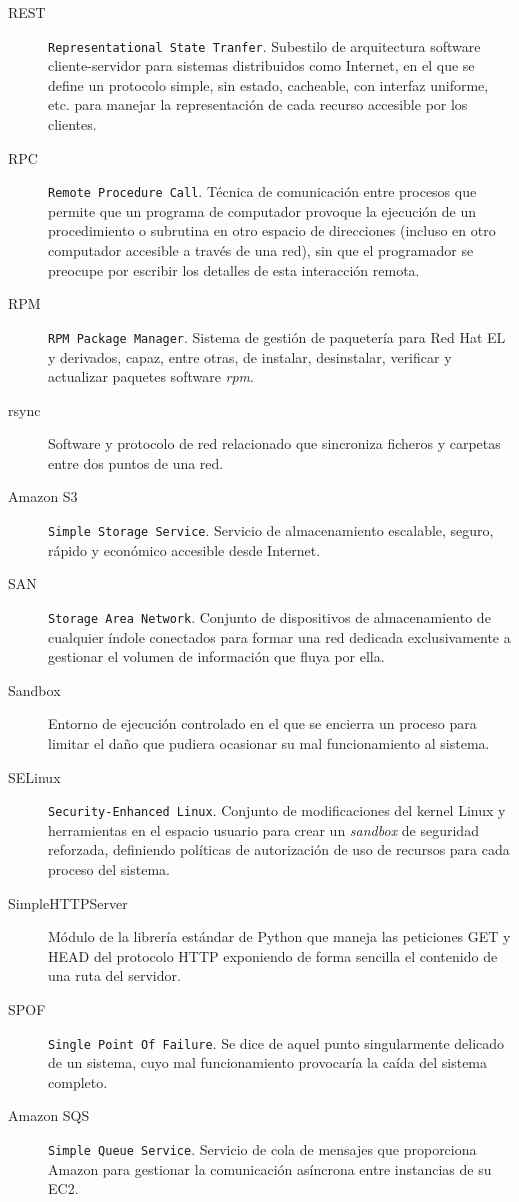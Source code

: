 \begin{description}
\item[REST] \texttt{Representational State Tranfer}. Subestilo de arquitectura software cliente-servidor para sistemas distribuidos como Internet, en el que se define un protocolo simple, sin estado, cacheable, con interfaz uniforme, etc. para manejar la representaci\'on de cada recurso accesible por los clientes.
\item[RPC] \texttt{Remote Procedure Call}. T\'ecnica de comunicaci\'on entre procesos que permite que un programa de computador provoque la ejecuci\'on de un procedimiento o subrutina en otro espacio de direcciones (incluso en otro computador accesible a trav\'es de una red), sin que el programador se preocupe por escribir los detalles de esta interacci\'on remota.
\item[RPM] \texttt{RPM Package Manager}. Sistema de gesti\'on de paqueter\'ia para Red Hat EL y derivados, capaz, entre otras, de instalar, desinstalar, verificar y actualizar paquetes software \emph{rpm}.
\item[rsync] Software y protocolo de red relacionado que sincroniza ficheros y carpetas entre dos puntos de una red.
\item[Amazon S3] \texttt{Simple Storage Service}. Servicio de almacenamiento es\-ca\-la\-ble, seguro, r\'apido y econ\'omico accesible desde Internet.
\item[SAN] \texttt{Storage Area Network}. Conjunto de dispositivos de almacenamiento de cualquier \'indole conectados para formar una red dedicada exclusivamente a gestionar el volumen de informaci\'on que fluya por ella.
\item[Sandbox] Entorno de ejecuci\'on controlado en el que se encierra un proceso para limitar el da\~no que pudiera ocasionar su mal funcionamiento al sistema.
\item[SELinux] \texttt{Security-Enhanced Linux}. Conjunto de modificaciones del kernel Linux y herramientas en el espacio usuario para crear un \emph{sandbox} de seguridad reforzada, definiendo pol\'iticas de autorizaci\'on de uso de recursos para cada proceso del sistema.
\item[SimpleHTTPServer] M\'odulo de la librer\'ia est\'andar de Python que maneja las peticiones GET y HEAD del protocolo HTTP exponiendo de forma sencilla el contenido de una ruta del servidor.
\item[SPOF] \texttt{Single Point Of Failure}. Se dice de aquel punto singularmente delicado de un sistema, cuyo mal funcionamiento provocar\'ia la ca\'ida del sistema completo.
\item[Amazon SQS] \texttt{Simple Queue Service}. Servicio de cola de mensajes que proporciona Amazon para gestionar la comunicaci\'on as\'incrona entre instancias de su EC2.

\end{description}
